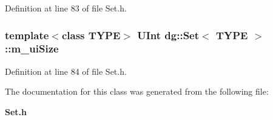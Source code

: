 Definition at line 83 of file Set.h.
\subsubsection{\setlength{\rightskip}{0pt plus 5cm}template$<$class TYPE$>$ {\bf UInt} dg::Set$<$ TYPE $>$::m\_\-ui\-Size\hspace{0.3cm}{\tt  [protected]}}\label{classdg_1_1Set_n2}




Definition at line 84 of file Set.h.

The documentation for this class was generated from the following file:\begin{CompactItemize}
\item 
{\bf Set.h}\end{CompactItemize}
